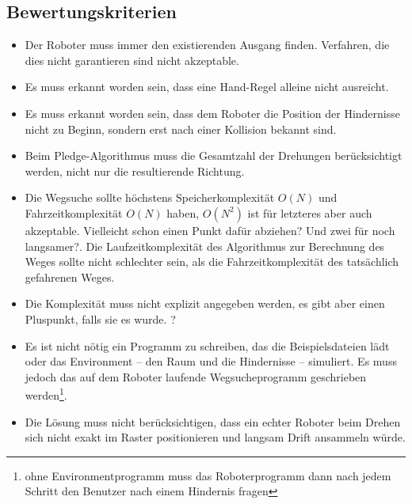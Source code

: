 \documentclass[10pt,a4paper]{article}
\newcommand{\notsure}[1]{{\color{red} #1}}
\begin{document}
\subsection{Bewertungskriterien}
  
\begin{itemize}

\item Der Roboter muss immer den existierenden Ausgang finden. Verfahren, die dies nicht garantieren  sind nicht akzeptable.

\item Es muss erkannt worden sein, dass eine Hand-Regel alleine nicht ausreicht.

\item Es muss erkannt worden sein, dass dem Roboter die Position der Hindernisse nicht zu Beginn, sondern erst nach einer Kollision bekannt sind.

\item Beim Pledge-Algorithmus muss die Gesamtzahl der Drehungen berücksichtigt werden, nicht nur die resultierende Richtung.

\item Die Wegsuche sollte höchstens Speicherkomplexität $O(N)$ und  Fahrzeitkomplexität $O(N)$ haben, $O(N^2)$ ist für letzteres aber auch akzeptable. \notsure{Vielleicht schon einen Punkt dafür abziehen? Und zwei für noch langsamer?}. Die Laufzeitkomplexität des Algorithmus zur Berechnung des Weges  sollte nicht schlechter sein, als die Fahrzeitkomplexität des tatsächlich gefahrenen Weges.

\item Die Komplexität muss nicht explizit angegeben werden, es gibt aber einen Pluspunkt, falls sie es wurde. \notsure{?}

\item Es ist nicht nötig ein Programm zu schreiben, das die Beispielsdateien lädt oder das Environment -- den Raum und die Hindernisse -- simuliert. Es muss jedoch das auf dem Roboter laufende Wegsucheprogramm geschrieben werden\footnote{ohne Environmentprogramm muss das Roboterprogramm dann nach jedem Schritt den Benutzer nach einem Hindernis fragen}. %


\item Die Lösung muss nicht berücksichtigen, dass ein echter Roboter beim Drehen sich nicht exakt im Raster positionieren und langsam Drift ansammeln würde.

\end{itemize}
\end{document}
